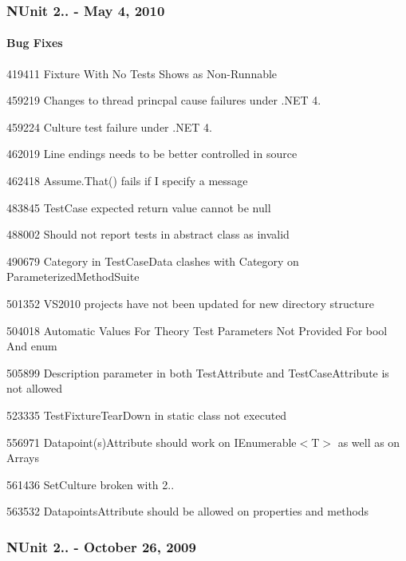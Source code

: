 \subsubsection*{N\+Unit 2.. -\/ May 4, 2010}

\paragraph*{Bug Fixes}


\begin{DoxyItemize}
\item 419411 Fixture With No Tests Shows as Non-\/\+Runnable
\item 459219 Changes to thread princpal cause failures under .N\+ET 4.
\item 459224 Culture test failure under .N\+ET 4.
\item 462019 Line endings needs to be better controlled in source
\item 462418 Assume.\+That() fails if I specify a message
\item 483845 Test\+Case expected return value cannot be null
\item 488002 Should not report tests in abstract class as invalid
\item 490679 Category in Test\+Case\+Data clashes with Category on Parameterized\+Method\+Suite
\item 501352 V\+S2010 projects have not been updated for new directory structure
\item 504018 Automatic Values For Theory Test Parameters Not Provided For bool And enum
\item 505899 \textquotesingle{}Description\textquotesingle{} parameter in both Test\+Attribute and Test\+Case\+Attribute is not allowed
\item 523335 Test\+Fixture\+Tear\+Down in static class not executed
\item 556971 Datapoint(s)Attribute should work on {\ttfamily I\+Enumerable$<$T$>$} as well as on Arrays
\item 561436 Set\+Culture broken with 2..
\item 563532 Datapoints\+Attribute should be allowed on properties and methods
\end{DoxyItemize}

\subsubsection*{N\+Unit 2.. -\/ October 26, 2009}

